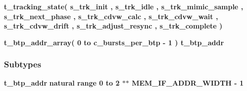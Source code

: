 \begin{DoxyCompactItemize}
\item 
{\bfseries {\bf t\+\_\+tracking\+\_\+state}{\bfseries \textcolor{vhdlchar}{(}\textcolor{vhdlchar}{ }\textcolor{vhdlchar}{s\+\_\+trk\+\_\+init}\textcolor{vhdlchar}{ }\textcolor{vhdlchar}{,}\textcolor{vhdlchar}{ }\textcolor{vhdlchar}{s\+\_\+trk\+\_\+idle}\textcolor{vhdlchar}{ }\textcolor{vhdlchar}{,}\textcolor{vhdlchar}{ }\textcolor{vhdlchar}{s\+\_\+trk\+\_\+mimic\+\_\+sample}\textcolor{vhdlchar}{ }\textcolor{vhdlchar}{,}\textcolor{vhdlchar}{ }\textcolor{vhdlchar}{s\+\_\+trk\+\_\+next\+\_\+phase}\textcolor{vhdlchar}{ }\textcolor{vhdlchar}{,}\textcolor{vhdlchar}{ }\textcolor{vhdlchar}{s\+\_\+trk\+\_\+cdvw\+\_\+calc}\textcolor{vhdlchar}{ }\textcolor{vhdlchar}{,}\textcolor{vhdlchar}{ }\textcolor{vhdlchar}{s\+\_\+trk\+\_\+cdvw\+\_\+wait}\textcolor{vhdlchar}{ }\textcolor{vhdlchar}{,}\textcolor{vhdlchar}{ }\textcolor{vhdlchar}{s\+\_\+trk\+\_\+cdvw\+\_\+drift}\textcolor{vhdlchar}{ }\textcolor{vhdlchar}{,}\textcolor{vhdlchar}{ }\textcolor{vhdlchar}{s\+\_\+trk\+\_\+adjust\+\_\+resync}\textcolor{vhdlchar}{ }\textcolor{vhdlchar}{,}\textcolor{vhdlchar}{ }\textcolor{vhdlchar}{s\+\_\+trk\+\_\+complete}\textcolor{vhdlchar}{ }\textcolor{vhdlchar}{)}\textcolor{vhdlchar}{ }}} 
\item 
{\bfseries {\bf t\+\_\+btp\+\_\+addr\+\_\+array}{\bfseries \textcolor{vhdlchar}{(}\textcolor{vhdlchar}{ }\textcolor{vhdlchar}{ } \textcolor{vhdldigit}{0} \textcolor{vhdlchar}{ }\textcolor{keywordflow}{to}\textcolor{vhdlchar}{ }\textcolor{vhdlchar}{ }\textcolor{vhdlchar}{ }\textcolor{vhdlchar}{ }{\bfseries {\bf c\+\_\+bursts\+\_\+per\+\_\+btp}} \textcolor{vhdlchar}{-\/}\textcolor{vhdlchar}{ } \textcolor{vhdldigit}{1} \textcolor{vhdlchar}{ }\textcolor{vhdlchar}{)}\textcolor{vhdlchar}{ }\textcolor{vhdlchar}{ }{\bfseries {\bf t\+\_\+btp\+\_\+addr}} \textcolor{vhdlchar}{ }}} 
\end{DoxyCompactItemize}
\subsubsection*{Subtypes}
 \begin{DoxyCompactItemize}
\item 
{\bf t\+\_\+btp\+\_\+addr} {\bfseries \textcolor{comment}{natural}\textcolor{vhdlchar}{ }\textcolor{vhdlchar}{ }\textcolor{vhdlchar}{ }\textcolor{keywordflow}{range}\textcolor{vhdlchar}{ }\textcolor{vhdlchar}{ } \textcolor{vhdldigit}{0} \textcolor{vhdlchar}{ }\textcolor{keywordflow}{to}\textcolor{vhdlchar}{ }\textcolor{vhdlchar}{ } \textcolor{vhdldigit}{2} \textcolor{vhdlchar}{$\ast$}\textcolor{vhdlchar}{$\ast$}\textcolor{vhdlchar}{ }\textcolor{vhdlchar}{ }\textcolor{vhdlchar}{ }{\bfseries {\bf M\+E\+M\+\_\+\+I\+F\+\_\+\+A\+D\+D\+R\+\_\+\+W\+I\+D\+TH}} \textcolor{vhdlchar}{-\/}\textcolor{vhdlchar}{ } \textcolor{vhdldigit}{1} \textcolor{vhdlchar}{ }} 
\end{DoxyCompactItemize}
